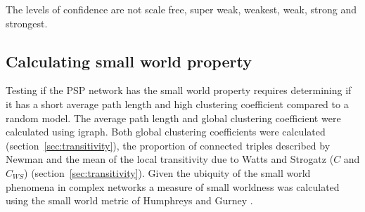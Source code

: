 The levels of confidence are not scale free, super weak, weakest, weak, strong and strongest\cite{broido2019scale}.

\subsection{Calculating small world property}
\label{sec:small world methods}

Testing if the PSP network has the small world property requires determining if it has a short average path length and high clustering coefficient compared to a random model. The average path length and global clustering coefficient were calculated using igraph. Both global clustering coefficients were calculated (section~\ref{sec:transitivity}), the proportion of connected triples described by Newman\cite{newman2002random} and the mean of the local transitivity due to Watts and Strogatz ($C$ and $C_{WS}$) (section~\ref{sec:transitivity})\cite{watts1998collective}. Given the ubiquity of the small world phenomena in complex networks\cite{newman2018networks} a measure of small worldness was calculated using the small world metric of Humphreys and Gurney \cite{humphries2008network}.

